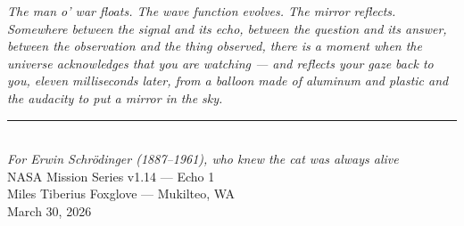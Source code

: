 \documentclass[12pt, letterpaper]{article}
\begin{document}
\vspace{1.5em}
\noindent\textit{The man o' war floats. The wave function evolves. The mirror reflects. Somewhere between the signal and its echo, between the question and its answer, between the observation and the thing observed, there is a moment when the universe acknowledges that you are watching --- and reflects your gaze back to you, eleven milliseconds later, from a balloon made of aluminum and plastic and the audacity to put a mirror in the sky.}

\vspace{2em}
\begin{center}
\rule{3cm}{0.4pt}\\[1em]
\textit{For Erwin Schr\"odinger (1887--1961), who knew the cat was always alive}\\[0.5em]
\small NASA Mission Series v1.14 --- Echo 1\\
Miles Tiberius Foxglove --- Mukilteo, WA\\
March 30, 2026
\end{center}
\end{document}
